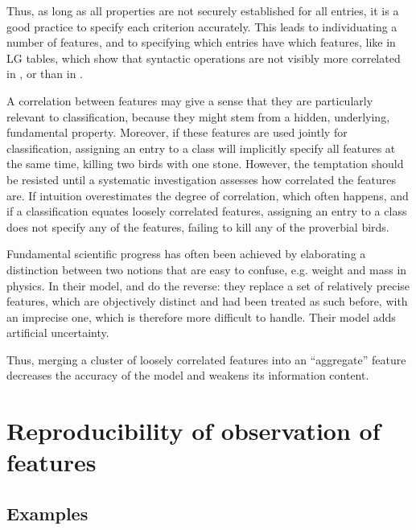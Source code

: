 \documentclass[output=paper]{langsci/langscibook}
\begin{document}
Thus, as long as all properties are not securely established for all entries, it is a good practice to specify each criterion accurately. This leads to individuating a number of features, and to specifying which entries have which features, like in LG tables, which show that syntactic operations are not visibly more correlated in  \citep{gross1982},  \citep{Vietri2011} or  \citep{fotopoulou1993} than in  \citep{Freckleton1985}.

A correlation between features may give a sense that they are particularly relevant to classification, because they might stem from a hidden, underlying, fundamental property. Moreover, if these features are used jointly for classification, assigning an entry to a class will implicitly specify all features at the same time, killing two birds with one stone. However, the temptation should be resisted until a systematic investigation assesses how correlated the features are. If intuition overestimates the degree of correlation, which often happens, and if a classification equates loosely correlated features, assigning an entry to a class does not specify any of the features, failing to kill any of the proverbial birds.

Fundamental scientific progress has often been achieved by elaborating a distinction between two notions that are easy to confuse, e.g. weight and mass in physics. In their model, \cite{Sag:2002}  and \citet{Baldwin2010} do the reverse: they replace a set of relatively precise features, which are objectively distinct and had been treated as such before, with an imprecise one, which is therefore more difficult to handle. Their model adds artificial uncertainty.

Thus, merging a cluster of loosely correlated features into an “aggregate” feature decreases the accuracy of the model and weakens its information content.

\section{Reproducibility of observation of features}
\label{sec:4}

\subsection{Examples} 
\end{document}
